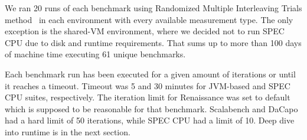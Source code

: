 \begin{table}[ht]
  \centering
  \caption{Summary of selected platforms.}
  \label{table:envs}
\end{table}

We ran 20 runs of each benchmark using Randomized Multiple Interleaving Trials method~\cite{abedi2017conducting} in each environment with every available measurement type.
The only exception is the \mbox{shared-VM} environment, where we decided not to run SPEC CPU due to disk and runtime requirements.
That sums up to more than 100 days of machine time executing 61 unique benchmarks.

Each benchmark run has been executed for a given amount of iterations or until it reaches a timeout.
Timeout was 5 and  30 minutes for \mbox{JVM-based} and SPEC CPU suites, respectively.
The iteration limit for Renaissance was set to default which is supposed to be reasonable for that benchmark.
Scalabench and DaCapo had a hard limit of 50 iterations, while SPEC CPU had a limit of 10.
Deep dive into runtime is in the next section.

